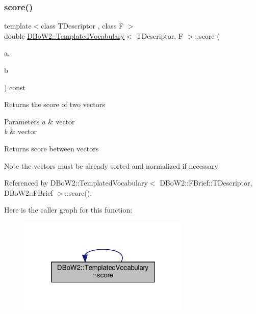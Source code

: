 \subsubsection{\texorpdfstring{score()}{score()}}
{\footnotesize\ttfamily template$<$class T\+Descriptor , class F $>$ \\
double \hyperlink{classDBoW2_1_1TemplatedVocabulary}{D\+Bo\+W2\+::\+Templated\+Vocabulary}$<$ T\+Descriptor, F $>$\+::score (\begin{DoxyParamCaption}\item[{const \hyperlink{classDBoW2_1_1BowVector}{Bow\+Vector} \&}]{a,  }\item[{const \hyperlink{classDBoW2_1_1BowVector}{Bow\+Vector} \&}]{b }\end{DoxyParamCaption}) const\hspace{0.3cm}{\ttfamily [inline]}}

Returns the score of two vectors 
\begin{DoxyParams}{Parameters}
{\em a} & vector \\
\hline
{\em b} & vector \\
\hline
\end{DoxyParams}
\begin{DoxyReturn}{Returns}
score between vectors 
\end{DoxyReturn}
\begin{DoxyNote}{Note}
the vectors must be already sorted and normalized if necessary 
\end{DoxyNote}


Referenced by D\+Bo\+W2\+::\+Templated\+Vocabulary$<$ D\+Bo\+W2\+::\+F\+Brief\+::\+T\+Descriptor, D\+Bo\+W2\+::\+F\+Brief $>$\+::score().

Here is the caller graph for this function\+:\nopagebreak
\begin{figure}[H]
\begin{center}
\leavevmode
\includegraphics[width=232pt]{classDBoW2_1_1TemplatedVocabulary_aedde9cc3255e41fd0441055eeb640346_icgraph}
\end{center}
\end{figure}
\mbox{\label{classDBoW2_1_1TemplatedVocabulary_a1a0a9cf4052090c041ff9442be7b22f6}} 
